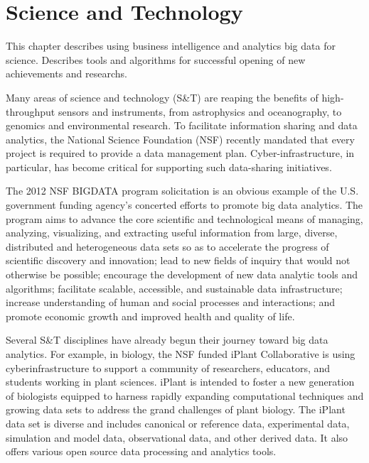 \section{Science and Technology}

This chapter describes using business intelligence and analytics big data for science. Describes tools and algorithms for successful opening of new achievements and researchs.

Many areas of science and technology (S\&T) are reaping the
benefits of high-throughput sensors and instruments, from
astrophysics and oceanography, to genomics and environmental
research. To facilitate information sharing and data
analytics, the National Science Foundation (NSF) recently
mandated that every project is required to provide a data
management plan. Cyber-infrastructure, in particular, has
become critical for supporting such data-sharing initiatives.

The 2012 NSF BIGDATA program solicitation is an obvious
example of the U.S. government funding agency’s concerted
efforts to promote big data analytics. The program
aims to advance the core scientific and technological
means of managing, analyzing, visualizing, and extracting
useful information from large, diverse, distributed
and heterogeneous data sets so as to accelerate
the progress of scientific discovery and innovation;
lead to new fields of inquiry that would not
otherwise be possible; encourage the development of
new data analytic tools and algorithms; facilitate
scalable, accessible, and sustainable data infrastructure;
increase understanding of human and social
processes and interactions; and promote economic
growth and improved health and quality of life.

Several S\&T disciplines have already begun their journey
toward big data analytics. For example, in biology, the NSF
funded iPlant Collaborative is using cyberinfrastructure to
support a community of researchers, educators, and students
working in plant sciences. iPlant is intended to foster a new
generation of biologists equipped to harness rapidly expanding
computational techniques and growing data sets to
address the grand challenges of plant biology. The iPlant data
set is diverse and includes canonical or reference data,
experimental data, simulation and model data, observational
data, and other derived data. It also offers various open
source data processing and analytics tools.

